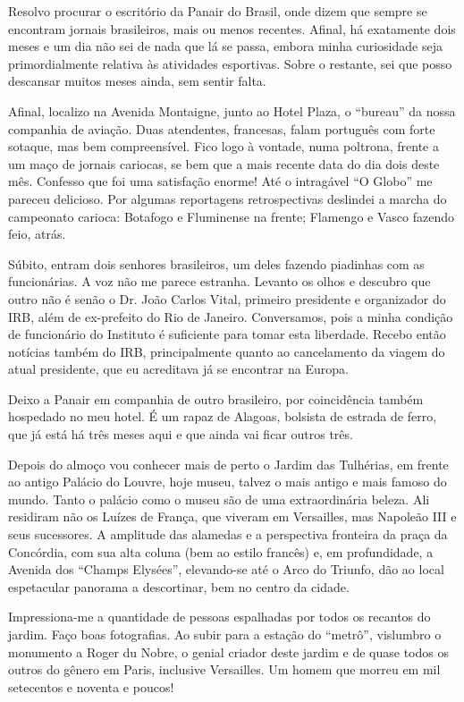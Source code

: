 Resolvo procurar o escritório da Panair do Brasil, onde dizem que sempre se encontram jornais brasileiros, mais ou menos recentes. Afinal, há exatamente dois meses e um dia não sei de nada que lá se passa, embora minha curiosidade seja primordialmente relativa às atividades esportivas. Sobre o restante, sei que posso descansar muitos meses ainda, sem sentir falta.

Afinal, localizo na Avenida Montaigne, junto ao Hotel Plaza, o ``bureau'' da nossa companhia de aviação. Duas atendentes, francesas, falam português com forte sotaque, mas bem compreensível. Fico logo à vontade, numa poltrona, frente a um maço de jornais cariocas, se bem que a mais recente data do dia dois deste mês. Confesso que foi uma satisfação enorme! Até o intragável ``O Globo'' me pareceu delicioso. Por algumas reportagens retrospectivas deslindei a marcha do campeonato carioca: Botafogo e Fluminense na frente; Flamengo e Vasco fazendo feio, atrás.

Súbito, entram dois senhores brasileiros, um deles fazendo piadinhas com as funcionárias. A voz não me parece estranha. Levanto os olhos e descubro que outro não é senão o Dr. João Carlos Vital, primeiro presidente e organizador do IRB, além de ex-prefeito do Rio de Janeiro. Conversamos, pois a minha condição de funcionário do Instituto é suficiente para tomar esta liberdade. Recebo então notícias também do IRB, principalmente quanto ao cancelamento da viagem do atual presidente, que eu acreditava já se encontrar na Europa.

Deixo a Panair em companhia de outro brasileiro, por coincidência também hospedado no meu hotel. É um rapaz de Alagoas, bolsista de estrada de ferro, que já está há três meses aqui e que ainda vai ficar outros três.

Depois do almoço vou conhecer mais de perto o Jardim das Tulhérias, em frente ao antigo Palácio do Louvre, hoje museu, talvez o mais antigo e mais famoso do mundo. Tanto o palácio como o museu são de uma extraordinária beleza. Ali residiram não os Luízes de França, que viveram em Versailles, mas Napoleão III e seus sucessores. A amplitude das alamedas e a perspectiva fronteira da praça da Concórdia, com sua alta coluna (bem ao estilo francês) e, em profundidade, a Avenida dos ``Champs Elysées'', elevando-se até o Arco do Triunfo, dão ao local espetacular panorama a descortinar, bem no centro da cidade.

Impressiona-me a quantidade de pessoas espalhadas por todos os recantos do jardim. Faço boas fotografias. Ao subir para a estação do ``metrô'', vislumbro o monumento a Roger du Nobre, o genial criador deste jardim e de quase todos os outros do gênero em Paris, inclusive Versailles. Um homem que morreu em mil setecentos e noventa e poucos!

